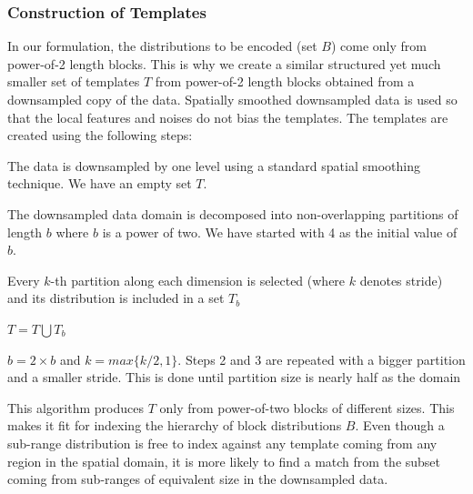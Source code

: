 \subsubsection{Construction of Templates}
\label{subsec:templateconstruction}

In our formulation, the distributions to be encoded (set $B$) come only from power-of-2 length blocks. This is why we create a similar structured yet much smaller set of templates $T$ from power-of-2 length blocks obtained from a downsampled copy of the data. Spatially smoothed downsampled data is used so that the local features and noises do not bias the templates. The templates are created using the following steps:
\begin{packed_enumerate}
\item The data is downsampled by one level using a standard spatial smoothing technique. We have an empty set $T$.
\item The downsampled data domain is decomposed into non-overlapping partitions of length $b$ where $b$ is a power of two. We have started with 4 as the initial value of $b$. 
\item Every $k$-th partition along each dimension is selected (where $k$ denotes stride) and its distribution is included in a set $T_b$
\item $T = T \bigcup T_b$
\item $b = 2\times b$ and $k = max \{k/2, 1\}$. Steps 2 and 3 are repeated with a bigger partition and a smaller stride. This is done until partition size is nearly half as the domain
\end{packed_enumerate}
This algorithm produces $T$ only from power-of-two blocks of different sizes. This makes it fit for indexing the hierarchy of block distributions $B$. Even though a sub-range distribution is free to index against any template coming from any region in the spatial domain, it is more likely to find a match from the subset coming from sub-ranges of equivalent size in the downsampled data. 
